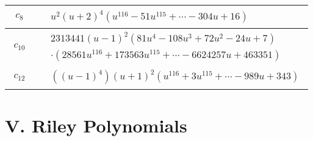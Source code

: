 \documentclass[1p]{elsarticle_modified}
\theoremstyle{definition}
\begin{document}
\begin{tabular}{m{50pt}|m{274pt}}
\hline $$\begin{aligned}c_{8}\end{aligned}$$&$\begin{aligned}
&u^2(u+2)^4(u^{116}-51 u^{115}+\cdots-304 u+16)
\end{aligned}$\\
\hline $$\begin{aligned}c_{10}\end{aligned}$$&$\begin{aligned}
&2313441(u-1)^2(81 u^4-108 u^3+72 u^2-24 u+7)\\
&\cdot(28561 u^{116}+173563 u^{115}+\cdots-6624257 u+463351)
\end{aligned}$\\
\hline $$\begin{aligned}c_{12}\end{aligned}$$&$\begin{aligned}
&((u-1)^4)(u+1)^2(u^{116}+3 u^{115}+\cdots-989 u+343)
\end{aligned}$\\
\hline
\end{tabular}\newpage\renewcommand{\arraystretch}{1}
\centering \section*{ V. Riley Polynomials}
\end{document}
